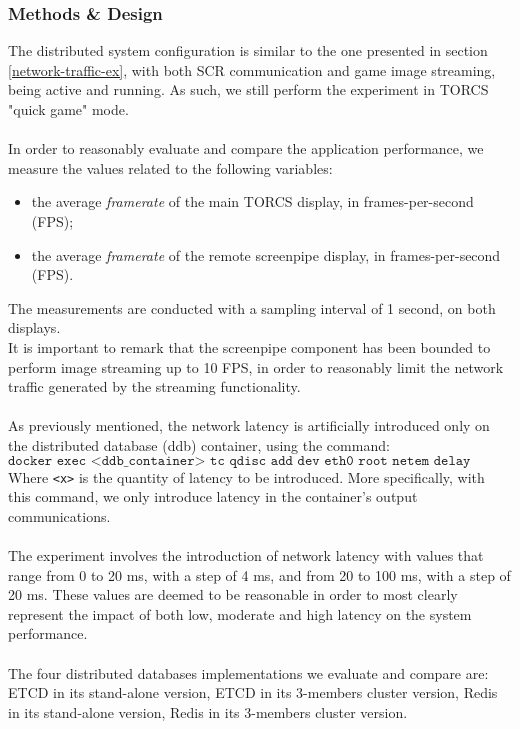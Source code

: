 \subsubsection{Methods \& Design}
The distributed system configuration is similar to the one presented in section \ref{network-traffic-ex}, with both SCR communication and game image streaming, being active and running. As such, we still perform the experiment in TORCS "quick game" mode. \\ \\
In order to reasonably evaluate and compare the application performance, we measure the values related to  the following variables:
\begin{itemize}
	\item the average \textit{framerate} of the main TORCS display, in frames-per-second (FPS);
	\item the average \textit{framerate} of the remote screenpipe display, in frames-per-second (FPS).
\end{itemize}
The measurements are conducted with a sampling interval of 1 second, on both displays. \\
It is important to remark that the screenpipe component has been bounded to perform image streaming up to 10 FPS, in order to reasonably limit the network traffic generated by the streaming functionality. \\ \\
As previously mentioned, the network latency is artificially introduced only on the distributed database (ddb) container, using the command: \[\texttt{docker exec <ddb\_container> tc qdisc add dev eth0 root netem delay <x>ms}\]
Where \texttt{<x>} is the quantity of latency to be introduced. More specifically, with this command, we only introduce latency in the container's output communications. \\ \\
The experiment involves the introduction of network latency with values that range from 0 to 20 ms, with a step of 4 ms, and from 20 to 100 ms, with a step of 20 ms. These values are deemed to be reasonable in order to most clearly represent the impact of both low, moderate and high latency on the system performance. \\ \\
The four distributed databases implementations we evaluate and compare are: ETCD in its stand-alone version, ETCD in its 3-members cluster version, Redis in its stand-alone version, Redis in its 3-members cluster version.


